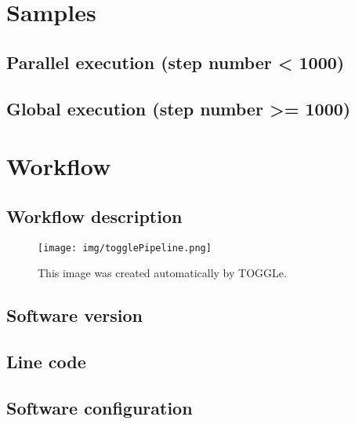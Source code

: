 \documentclass[a4paper]{article}
\begin{document}


\section{Samples}

\subsection{Parallel execution (step number < 1000)}



\subsection{Global execution (step number >= 1000)}


\section{Workflow}

\subsection{Workflow description}

\begin{figure}[ht]
\centering
\texttt{[image: img/togglePipeline.png]}
\caption{\label{fig:worflow}This image was created automatically by TOGGLe.}
\end{figure}

\subsection{Software version}


 

\subsection{Line code}




\subsection{Software configuration}
\end{document}

